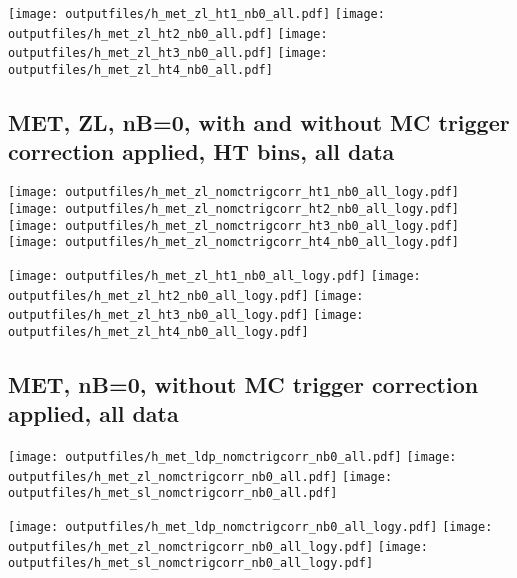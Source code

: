 \documentclass[11pt]{article}
\begin{document}
    \noindent
     \texttt{[image: outputfiles/h\_met\_zl\_ht1\_nb0\_all.pdf]}
     \texttt{[image: outputfiles/h\_met\_zl\_ht2\_nb0\_all.pdf]}
     \texttt{[image: outputfiles/h\_met\_zl\_ht3\_nb0\_all.pdf]}
     \texttt{[image: outputfiles/h\_met\_zl\_ht4\_nb0\_all.pdf]}

    \clearpage
     \subsection{ MET, ZL, nB=0, with and without MC trigger correction applied, HT bins, all data}

    \noindent
     \texttt{[image: outputfiles/h\_met\_zl\_nomctrigcorr\_ht1\_nb0\_all\_logy.pdf]}
     \texttt{[image: outputfiles/h\_met\_zl\_nomctrigcorr\_ht2\_nb0\_all\_logy.pdf]}
     \texttt{[image: outputfiles/h\_met\_zl\_nomctrigcorr\_ht3\_nb0\_all\_logy.pdf]}
     \texttt{[image: outputfiles/h\_met\_zl\_nomctrigcorr\_ht4\_nb0\_all\_logy.pdf]}


    \noindent
     \texttt{[image: outputfiles/h\_met\_zl\_ht1\_nb0\_all\_logy.pdf]}
     \texttt{[image: outputfiles/h\_met\_zl\_ht2\_nb0\_all\_logy.pdf]}
     \texttt{[image: outputfiles/h\_met\_zl\_ht3\_nb0\_all\_logy.pdf]}
     \texttt{[image: outputfiles/h\_met\_zl\_ht4\_nb0\_all\_logy.pdf]}


   \clearpage
    \subsection{ MET, nB=0, without MC trigger correction applied, all data}

    \noindent
    \texttt{[image: outputfiles/h\_met\_ldp\_nomctrigcorr\_nb0\_all.pdf]}
    \texttt{[image: outputfiles/h\_met\_zl\_nomctrigcorr\_nb0\_all.pdf]}
    \texttt{[image: outputfiles/h\_met\_sl\_nomctrigcorr\_nb0\_all.pdf]}

    \noindent
    \texttt{[image: outputfiles/h\_met\_ldp\_nomctrigcorr\_nb0\_all\_logy.pdf]}
    \texttt{[image: outputfiles/h\_met\_zl\_nomctrigcorr\_nb0\_all\_logy.pdf]}
    \texttt{[image: outputfiles/h\_met\_sl\_nomctrigcorr\_nb0\_all\_logy.pdf]}
\end{document}
